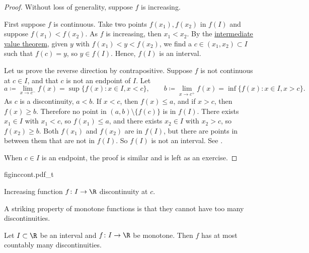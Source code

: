 \begin{proof}
Without loss of generality, suppose $f$ is increasing.

First suppose $f$ is continuous.  Take two points
$f(x_1), f(x_2)$ in $f(I)$ and suppose
$f(x_1) < f(x_2)$.
As $f$ is increasing, then $x_1 < x_2$.  By the
\hyperref[IVT:thm]{intermediate value theorem},
given $y$ with $f(x_1) < y < f(x_2)$, we find
a $c \in (x_1,x_2) \subset I$ such that $f(c) = y$, so $y \in f(I)$. 
Hence, $f(I)$ is an interval.

Let us prove the reverse direction by contrapositive.
Suppose $f$ is not continuous at $c \in I$,
and that $c$ is not an endpoint of $I$.
Let
\begin{equation*}
a
\coloneqq \lim_{x \to c^-} f(x) = \sup \bigl\{ f(x) : x \in I, x < c \bigr\} ,
\qquad
b
\coloneqq \lim_{x \to c^+} f(x) = \inf \bigl\{ f(x) : x \in I, x > c \bigr\} .
\end{equation*}
As $c$ is a discontinuity, $a < b$.
If $x < c$, then $f(x) \leq a$, and
if $x > c$, then $f(x) \geq b$.  Therefore
no point
in $(a,b) \setminus \bigl\{ f(c) \bigr\}$ is in $f(I)$.
There exists $x_1 \in I$ with $x_1 < c$, so
$f(x_1) \leq a$, and there exists $x_2 \in I$ with $x_2 > c$,
so $f(x_2) \geq b$.  Both $f(x_1)$ and $f(x_2)$ are in $f(I)$,
but there are points in between them that are not in $f(I)$.
So $f(I)$ is not an interval.  See .

When $c \in I$ is an endpoint, the proof is similar and is left as an exercise.
\end{proof}

\begin{myfigureht}
{figinccont.pdf_t}
\caption{Increasing function $f \colon I \to \R$ discontinuity at
$c$.\label{fig:figinccont}}
\end{myfigureht}

A striking property of monotone functions is that they cannot have
too many discontinuities.

\begin{cor} \label{cor:monotcountcont}
Let $I \subset \R$ be an interval and
$f \colon I \to \R$ be monotone.  Then $f$ has at most
countably many discontinuities.
\end{cor}

